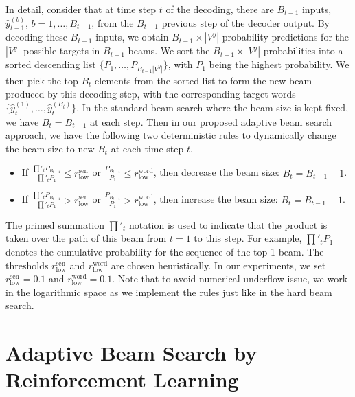 \documentclass[11pt,a4paper]{article}
\begin{document}
In detail, consider that at time step $t$ of the decoding, there are $B_{t-1}$ inputs, $\hat{y}_{t-1}^{(b)}$, $b = 1, \dots, B_{t-1}$, from the $B_{t-1}$ previous step of the decoder output. By decoding these $B_{t-1}$ inputs, we obtain $B_{t-1} \times |V^y|$ probability predictions for the $|V^y|$ possible targets in $B_{t-1}$ beams. We sort the $B_{t-1} \times |V^y|$ probabilities into a sorted descending list $\{ P_1, \dots, P_{B_{t-1} |V^y|} \}$, with $P_1$ being the highest probability. We then pick the top $B_t$ elements from the sorted list to form the new beam produced by this decoding step, with the corresponding target words $\{ \hat{y}_{t}^{(1)}, \dots, \hat{y}_{t}^{(B_t)} \}$. In the standard beam search where the beam size is kept fixed, we have $B_t = B_{t-1}$ at each step. Then in our proposed adaptive beam search approach, we have the following two deterministic rules to dynamically change the beam size to new $B_t$ at each time step $t$. 
\begin{itemize}
\item If $\displaystyle{\frac{\prod'_t P_{B_{t-1}}}{\prod'_t P_1}} \leq r^{\textrm{sen}}_{\textrm{low}}$ or $\displaystyle{\frac{P_{B_{t-1}}}{P_1}} \leq r^{\textrm{word}}_{\textrm{low}}$, then decrease the beam size: $B_t = B_{t-1} - 1$.
\item If $\displaystyle{\frac{\prod'_t P_{B_{t-1}}}{\prod'_t P_1}} > r^{\textrm{sen}}_{\textrm{low}}$ or $\displaystyle{\frac{P_{B_{t-1}}}{P_1}} > r^{\textrm{word}}_{\textrm{low}}$, then increase the beam size: $B_t = B_{t-1} + 1$.
\end{itemize}
The primed summation $\prod'_t$ notation is used to indicate that the product is taken over the path of this beam from $t = 1$ to this step. For example, $\prod'_t P_1$ denotes the cumulative probability for the sequence of the top-1 beam. The thresholds  $r^{\textrm{sen}}_{\textrm{low}}$ and $r^{\textrm{word}}_{\textrm{low}}$ are chosen heuristically. In our experiments, we set $r^{\textrm{sen}}_{\textrm{low}} = 0.1$ and $r^{\textrm{word}}_{\textrm{low}} = 0.1$. Note that to avoid numerical underflow issue, we work in the logarithmic space as we implement the rules just like in the hard beam search.






\section{Adaptive Beam Search by Reinforcement Learning}
\label{sec:RL}
\end{document}
